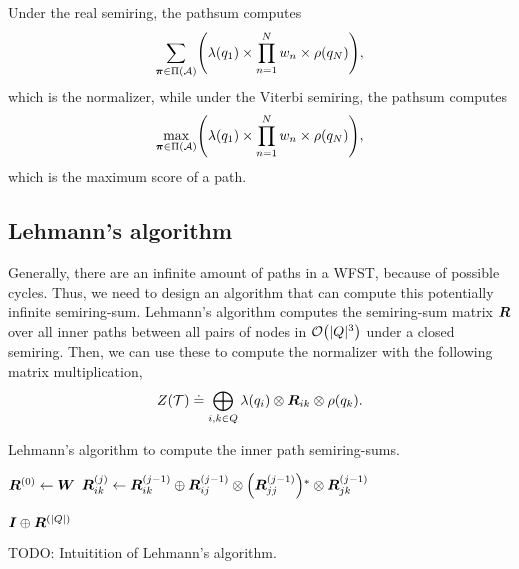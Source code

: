 Under the real semiring, the pathsum computes \[
  \sum_{\bm{\pi}\in\Pi(\mathcal{A})} \lft( \lambda(q_1) \times \prod_{n=1}^N w_n \times \rho(q_N) \rgt)
,\]
which is the normalizer, while under the Viterbi semiring, the pathsum computes
\[
  \max_{\bm{\pi}\in\Pi(\mathcal{A})} \lft( \lambda(q_1) \times \prod_{n=1}^N w_n \times \rho(q_N) \rgt)
,\]
which is the maximum score of a path.

\subsection{Lehmann's algorithm}

Generally, there are an infinite amount of paths in a WFST, because of possible
cycles. Thus, we need to design an algorithm that can compute this potentially
infinite semiring-sum. Lehmann's algorithm \citep{lehmann1977algebraic}
computes the semiring-sum matrix $\bm{R}$ over all inner paths between all
pairs of nodes in $\bigo{|Q|^3}$ under a closed semiring. Then, we can use
these to compute the normalizer with the following matrix multiplication, \[
  Z(\mathcal{T}) \doteq \bigoplus_{i,k \in Q} \lambda(q_i) \otimes \bm{R}_{ik} \otimes \rho(q_k)
.\]

\begin{algorithm}
  \caption{Lehmann's algorithm to compute the inner path semiring-sums.}
  \label{alg:lehmann}

  \begin{algorithmic}[1]
      \State $\bm{R}^{(0)} \gets \bm{W}$
           
            \State $\mat{R}_{ik}^{(j)} \gets \mat{R}_{ik}^{(j-1)} \oplus \mat{R}_{ij}^{(j-1)} \otimes \lft( \mat{R}_{jj}^{(j-1)} \rgt)^* \otimes \mat{R}_{jk}^{(j-1)}$
          \EndFor
        \EndFor
      \EndFor

      \State \Return $\bm{I} \oplus \bm{R}^{(|Q|)}$
    \EndFunction
  \end{algorithmic}
\end{algorithm}

TODO: Intuitition of Lehmann's algorithm.

